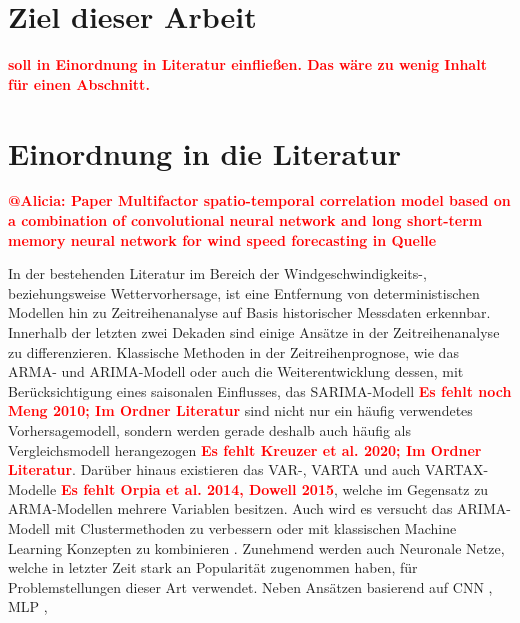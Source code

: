 \documentclass[
12pt, %
toc=listofnumbered, %
toc=chapterentrydotfill, %
numbers=noenddot, %
captions=tableheading, %
bibliography=numbered
]{scrreprt}
\let\Oldsection\section
\renewcommand{\section}{\FloatBarrier\Oldsection}
\newcommand{\qm}[1]{\glqq#1\grqq{}} %
\newcommand{\highlight}[1]{\textbf{\textcolor{red}{#1}}}
\begin{document}
\section{Ziel dieser Arbeit}
\highlight{soll in Einordnung in Literatur einfließen. Das wäre zu wenig Inhalt für einen Abschnitt.}

\section{Einordnung in die Literatur}
\highlight{@Alicia: Paper \qm{Multifactor spatio-temporal correlation model based on a combination of convolutional neural network and long short-term memory neural network for wind speed forecasting} in Quelle \cite{2019_Chen_MultifactorSpatiotemporalCorrelation}\bigskip}

In der bestehenden Literatur im Bereich der Windgeschwindigkeits-, beziehungsweise Wettervorhersage, ist eine Entfernung von 
deterministischen Modellen \cite{1963_Lorenz_DeterministicNonperiodicFlow} hin zu Zeitreihenanalyse auf Basis historischer Messdaten erkennbar. 
Innerhalb der letzten zwei Dekaden sind einige Ansätze in der Zeitreihenanalyse zu differenzieren. Klassische Methoden in der 
Zeitreihenprognose, wie das ARMA- und ARIMA-Modell \cite{2016_Cadenas_WindSpeedPrediction} oder auch 
die Weiterentwicklung dessen, mit Berücksichtigung eines saisonalen Einflusses, das SARIMA-Modell 
\highlight{Es fehlt noch Meng 2010; Im Ordner Literatur}\cite{2018_Alencar_HybridApproachCombining,2019_TenaGarcia_ForecastDailyOutput,2019_Haddad_WindSolarForecasting,2002_Igboekwe_StochasticSimulationHourly,2012_MuhammadSami_PredictionRateDust} sind 
nicht nur ein häufig verwendetes Vorhersagemodell, sondern werden gerade deshalb auch häufig als Vergleichsmodell herangezogen 
\highlight{Es fehlt Kreuzer et al. 2020; Im Ordner Literatur}\cite{2012_Cao_ForecastingWindSpeed}. Darüber hinaus existieren das VAR-, VARTA und auch VARTAX-Modelle 
\highlight{Es fehlt Orpia et al. 2014, Dowell 2015}\cite{2007_Ewing_TimeSeriesAnalysis,2015_He_SparsifiedVectorAutoregressive,2016_Koivisto_WindSpeedModeling}, 
welche im Gegensatz zu ARMA-Modellen mehrere Variablen besitzen. Auch wird es versucht das ARIMA-Modell mit Clustermethoden 
zu verbessern oder mit klassischen Machine Learning Konzepten zu kombinieren \cite{2017_Zhang_HybridMethodShortTerm,2011_Guo_CorrectedHybridApproach}. 
Zunehmend werden auch Neuronale Netze, welche in letzter Zeit stark an Popularität zugenommen haben, für Problemstellungen dieser 
Art verwendet. Neben Ansätzen basierend auf CNN \cite{2020_Zhao_ShorttermAverageWind,2019_Chen_MultifactorSpatiotemporalCorrelation}, MLP \cite{2019_Samet_EvaluationNeuralNetworkbased}, 
\end{document}
